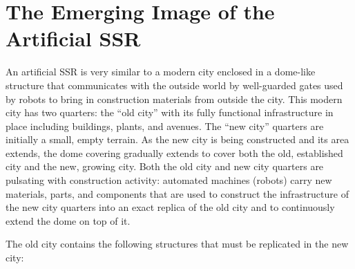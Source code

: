\section{The Emerging Image of the Artificial SSR}

An artificial SSR is very similar to a modern city enclosed in a
dome-like structure that communicates with the outside world by
well-guarded gates used by robots to bring in construction materials
from outside the city. This modern city has two quarters: the “old
city” with its fully functional infrastructure in place including
buildings, plants, and avenues. The “new city” quarters are initially a
small, empty terrain. As the new city is being constructed and its area
extends, the dome covering gradually extends to cover both the
old, established city and the new, growing city. Both the old city and new city quarters
are pulsating with construction activity: automated machines (robots)
carry new materials, parts, and components that are used to construct
the infrastructure of the new city quarters into an exact replica of the old city and to continuously extend the dome on top of it.

The old city contains the following structures that must be replicated in the new city:

